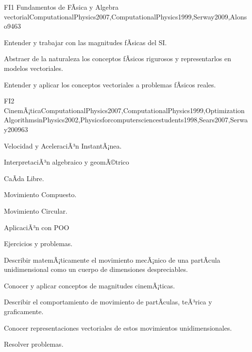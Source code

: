 \begin{syllabus}
\begin{unit}{FI1 Fundamentos de FÃ­sica y Algebra vectorial}{ComputationalPhysics2007,ComputationalPhysics1999,Serway2009,Alonso94}{6}{3}
   \begin{unitgoals}
      \item Entender y trabajar con las magnitudes fÃ­sicas del SI.
      \item Abstraer de la naturaleza los conceptos fÃ­sicos rigurosos y
      representarlos en modelos vectoriales.
      \item Entender y aplicar los conceptos vectoriales a problemas fÃ­sicos reales.
   \end{unitgoals}
\end{unit}

\begin{unit}{FI2 CinemÃ¡tica}{ComputationalPhysics2007,ComputationalPhysics1999,OptimizationAlgorithmsinPhysics2002,Physicsforcomputersciencestudents1998,Sears2007,Serway2009}{6}{3}
\begin{topics}
      \item Velocidad y AceleraciÃ³n InstantÃ¡nea.
      \item InterpretaciÃ³n algebraico y geomÃ©trico
      \item CaÃ­da Libre.
      \item Movimiento Compuesto.
      \item Movimiento Circular.
      \item AplicaciÃ³n con POO
      \item Ejercicios y problemas.
    \end{topics}
   \begin{unitgoals}
      \item Describir matemÃ¡ticamente el movimiento mecÃ¡nico de una partÃ­cula unidimensional como un cuerpo de dimensiones despreciables.
      \item Conocer y aplicar conceptos de magnitudes cinemÃ¡ticas.
      \item Describir el comportamiento de movimiento de partÃ­culas, teÃ³rica y graficamente.
      \item Conocer representaciones vectoriales de estos movimientos unidimensionales.
      \item Resolver problemas.
   \end{unitgoals}
\end{unit}


\end{syllabus}
